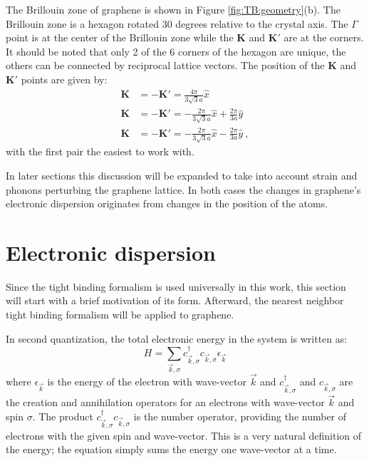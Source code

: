 The Brillouin zone of graphene is shown in Figure \ref{fig:TB:geometry}(b).
The Brillouin zone is a hexagon rotated 30 degrees relative to the crystal axis.
The $\Gamma$ point is at the center of the Brillouin zone while the $\bm{K}$ and $\bm{K'}$ are at the corners.
It should be noted that only 2 of the 6 corners of the hexagon are unique, the others can be connected by reciprocal lattice vectors.
The position of the $\bm{K}$ and $\bm{K'}$ points are given by:
\begin{align*}
	\bm{K}&=-\bm{K'}= \frac{4 \pi}{3 \sqrt{3} a} \hat{x} \\
	\bm{K}&=-\bm{K'}=-\frac{2 \pi}{3 \sqrt{3} a} \hat{x} + \frac{2 \pi}{3 a} \hat{y} \\
	\bm{K}&=-\bm{K'}=-\frac{2 \pi}{3 \sqrt{3} a} \hat{x} - \frac{2 \pi}{3 a} \hat{y} \ ,
\end{align*}
with the first pair the easiest to work with.

In later sections this discussion will be expanded to take into account strain and phonons perturbing the graphene lattice.
In both cases the changes in graphene's electronic dispersion originates from changes in the position of the atoms.

\section{Electronic dispersion}
Since the tight binding formalism is used universally in this work, this section will start with a brief motivation of its form.
Afterward, the nearest neighbor tight binding formalism will be applied to graphene.

In second quantization, the total electronic energy in the system is written as:
\begin{equation*}
	H=\sum_{\vec{k},\sigma} c^{\dagger}_{\vec{k},\sigma} c_{\vec{k},\sigma} \epsilon_{\vec{k}}
\end{equation*}
where $\epsilon_{\vec{k}}$ is the energy of the electron with wave-vector $\vec{k}$ and $c^{\dagger}_{\vec{k},\sigma}$ and $c_{\vec{k},\sigma}$ are the creation and annihilation operators for an electrons with wave-vector $\vec{k}$ and spin $\sigma$.
The product $c^{\dagger}_{\vec{k},\sigma} c_{\vec{k},\sigma}$ is the number operator, providing the number of electrons with the given spin and wave-vector.
This is a very natural definition of the energy; the equation simply sums the energy one wave-vector at a time.

